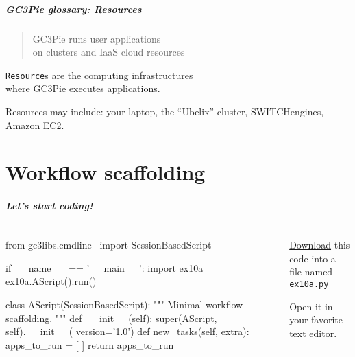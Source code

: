 \documentclass[english,serif,mathserif,xcolor=pdftex,dvipsnames,table]{beamer}
\begin{document}
\begin{frame}
  \frametitle{GC3Pie glossary: Resources}
  \begin{quote}
    GC3Pie runs user applications
    \\
    on clusters and IaaS cloud \alert{resources}
  \end{quote}

  \+ \alert{\texttt{Resource}s are the computing infrastructures \\ where GC3Pie executes applications.}

  \+ Resources may include: your laptop, the ``Ubelix'' cluster, SWITCHengines, Amazon EC2.
\end{frame}


\part{Workflow scaffolding}

\begin{frame}[fragile]
  \frametitle{Let's start coding!}
  \begin{columns}
    \begin{column}{0.7\linewidth}
\begin{python}
from gc3libs.cmdline \
  import SessionBasedScript

if __name__ == '__main__':
  import ex10a
  ex10a.AScript().run()

class AScript(SessionBasedScript):
  """
  Minimal workflow scaffolding.
  """
  def __init__(self):
    super(AScript, self).__init__(
        version='1.0')
  def new_tasks(self, extra):
    apps_to_run = [ ]
    return apps_to_run
\end{python}
    \end{column}
    \begin{column}{0.3\linewidth}
      \href{https://raw.githubusercontent.com/riccardomurri/python-for-science-intro/master/download/ex10a.py}{Download} this code into a file named \texttt{ex10a.py}

      \+
      Open it in your favorite text editor.
    \end{column}
  \end{columns}
\end{frame}
\end{document}
